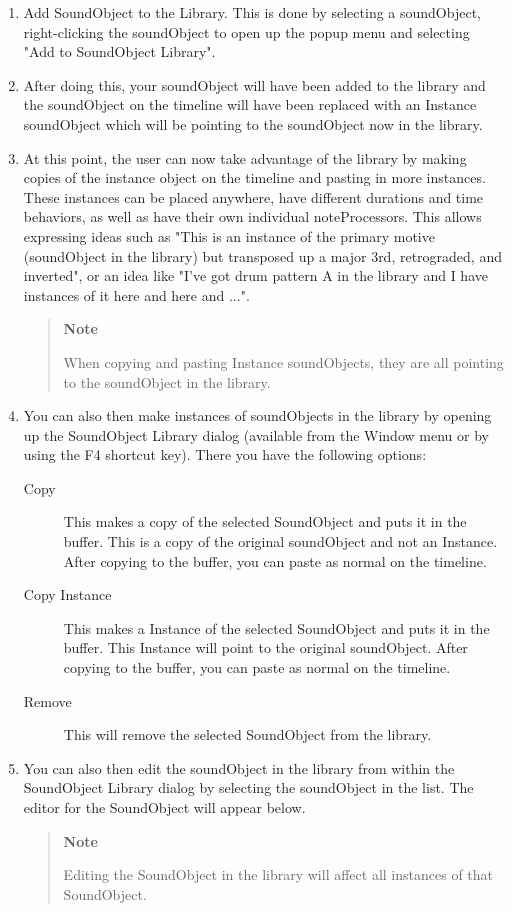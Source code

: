 \begin{enumerate}
\def\labelenumi{\arabic{enumi}.}
\item
  Add SoundObject to the Library. This is done by selecting a
  soundObject, right-clicking the soundObject to open up the popup menu
  and selecting "Add to SoundObject Library".
\item
  After doing this, your soundObject will have been added to the library
  and the soundObject on the timeline will have been replaced with an
  Instance soundObject which will be pointing to the soundObject now in
  the library.
\item
  At this point, the user can now take advantage of the library by
  making copies of the instance object on the timeline and pasting in
  more instances. These instances can be placed anywhere, have different
  durations and time behaviors, as well as have their own individual
  noteProcessors. This allows expressing ideas such as "This is an
  instance of the primary motive (soundObject in the library) but
  transposed up a major 3rd, retrograded, and inverted", or an idea like
  "I've got drum pattern A in the library and I have instances of it
  here and here and ...".

  \begin{quote}
  \textbf{Note}

  When copying and pasting Instance soundObjects, they are all pointing
  to the soundObject in the library.
  \end{quote}
\item
  You can also then make instances of soundObjects in the library by
  opening up the SoundObject Library dialog (available from the Window
  menu or by using the F4 shortcut key). There you have the following
  options:

  \begin{description}
  \item[Copy]
  This makes a copy of the selected SoundObject and puts it in the
  buffer. This is a copy of the original soundObject and not an
  Instance. After copying to the buffer, you can paste as normal on the
  timeline.
  \item[Copy Instance]
  This makes a Instance of the selected SoundObject and puts it in the
  buffer. This Instance will point to the original soundObject. After
  copying to the buffer, you can paste as normal on the timeline.
  \item[Remove]
  This will remove the selected SoundObject from the library.
  \end{description}
\item
  You can also then edit the soundObject in the library from within the
  SoundObject Library dialog by selecting the soundObject in the list.
  The editor for the SoundObject will appear below.

  \begin{quote}
  \textbf{Note}

  Editing the SoundObject in the library will affect all instances of
  that SoundObject.
  \end{quote}
\end{enumerate}


